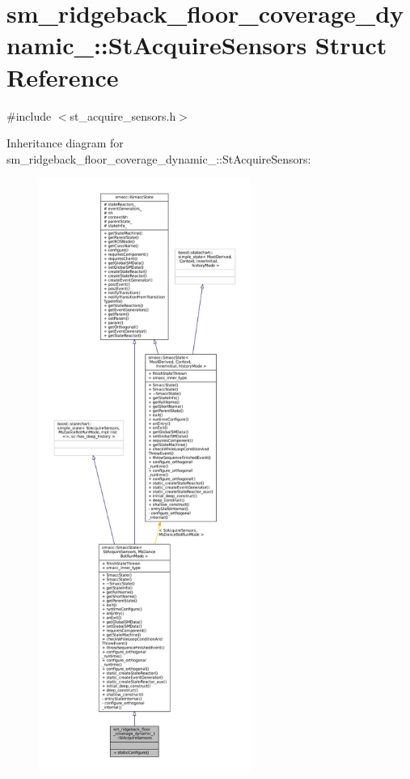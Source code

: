 \hypertarget{structsm__ridgeback__floor__coverage__dynamic__1_1_1StAcquireSensors}{}\section{sm\+\_\+ridgeback\+\_\+floor\+\_\+coverage\+\_\+dynamic\+\_\+:\+:St\+Acquire\+Sensors Struct Reference}
\label{structsm__ridgeback__floor__coverage__dynamic__1_1_1StAcquireSensors}


{\ttfamily \#include $<$st\+\_\+acquire\+\_\+sensors.\+h$>$}



Inheritance diagram for sm\+\_\+ridgeback\+\_\+floor\+\_\+coverage\+\_\+dynamic\+\_\+:\+:St\+Acquire\+Sensors\+:
\nopagebreak
\begin{figure}[H]
\begin{center}
\leavevmode
\includegraphics[height=550pt]{structsm__ridgeback__floor__coverage__dynamic__1_1_1StAcquireSensors__inherit__graph}
\end{center}
\end{figure}


